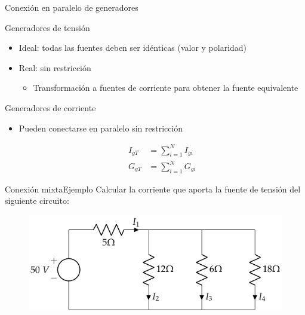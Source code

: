 \documentclass[aspectratio=169, xcolor={usenames,svgnames,dvipsnames}]{beamer}
\begin{document}
\begin{frame}{Conexión en paralelo de generadores}

    \begin{block}{Generadores de tensión}
    \begin{itemize}
    \vspace{2mm}
    \item \alert{Ideal}: todas las fuentes \alert{deben ser idénticas} (valor y polaridad)
    \vspace{2mm}
    \item \alert{Real}:  sin restricción
        \begin{itemize}
        \item \normalsize{Transformación a fuentes de corriente para obtener la \alert{fuente equivalente}}
        \end{itemize}
    \end{itemize}
    \end{block}    
    
    \begin{block}{Generadores de corriente}
    \begin{itemize}
    \item Pueden conectarse en paralelo \alert{sin restricción}

    \vspace{-5mm}
    \begin{align*}
      I_{gT} &= \sum_{i = 1}^N I_{gi}\\
      G_{gT} &= \sum_{i = 1}^N G_{gi}
    \end{align*}
    \end{itemize}
    \vspace{-3mm}
    \end{block}
\end{frame}


\begin{frame}{Conexión mixta}{Ejemplo}
    Calcular la corriente que aporta la fuente de tensión del siguiente circuito:
		\begin{figure}[H]
			\centering
			\includegraphics{../figs/ej1_BT1.pdf}
		\end{figure}
\end{frame}
\end{document}
